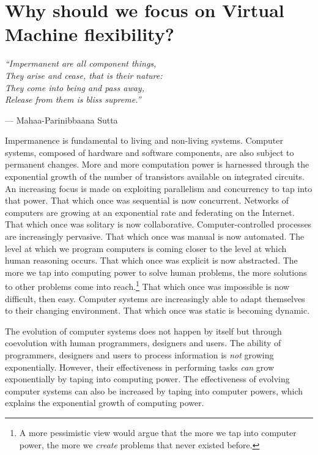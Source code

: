 \chapter{Why should we focus on Virtual Machine flexibility?}

\emph{``Impermanent are all component things,\\
They arise and cease, that is their nature:\\
They come into being and pass away,\\
Release from them is bliss supreme.''} 

--- Mahaa-Parinibbaana Sutta \cite{1988last}

Impermanence is fundamental to living and non-living systems. Computer systems,
composed of hardware and software components, are also subject to permanent
changes. More and more computation power is harnessed through the exponential
growth of the number of transistors available on integrated circuits. An
increasing focus is made on exploiting parallelism and concurrency to tap into
that power. That which once was sequential is now concurrent. Networks of
computers are growing at an exponential rate and federating on the Internet.
That which once was solitary is now collaborative.  Computer-controlled
processes are increasingly pervasive. That which once was manual is now
automated. The level at which we program computers is coming closer to the
level at which human reasoning occurs. That which once was explicit is now
abstracted.  The more we tap into computing power to solve human problems, the
more solutions to other problems come into reach.\footnote{A more pessimistic
view would argue that the more we tap into computer power, the more we
\textit{create} problems that never existed before.} That which once was
impossible is now difficult, then easy. Computer systems are increasingly able
to adapt themselves to their changing environment. That which once was static
is becoming dynamic.

The evolution of computer systems does not happen by itself but
through coevolution with human programmers, designers and users. The ability of
programmers, designers and users to process information is \textit{not} growing
exponentially. However, their effectiveness in performing tasks \textit{can}
grow exponentially by taping into computing power. The effectiveness of
evolving computer systems can also be increased by taping into computer powers,
which explains the exponential growth of computing power.  


